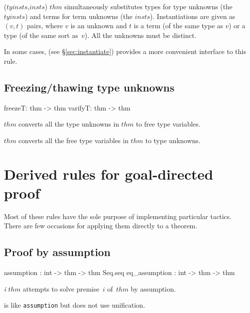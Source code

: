 \begin{ttdescription}
\item[\ttindexbold{instantiate} ($tyinsts$,$insts$) $thm$] 
simultaneously substitutes types for type unknowns (the
$tyinsts$) and terms for term unknowns (the $insts$).  Instantiations are
given as $(v,t)$ pairs, where $v$ is an unknown and $t$ is a term (of the
same type as $v$) or a type (of the same sort as~$v$).  All the unknowns
must be distinct.  

In some cases,  (see \S\ref{sec:instantiate})
provides a more convenient interface to this rule.
\end{ttdescription}




\subsection{Freezing/thawing type unknowns}
\begin{ttbox} 
freezeT: thm -> thm
varifyT: thm -> thm
\end{ttbox}
\begin{ttdescription}
\item[\ttindexbold{freezeT} $thm$] 
converts all the type unknowns in $thm$ to free type variables.

\item[\ttindexbold{varifyT} $thm$] 
converts all the free type variables in $thm$ to type unknowns.
\end{ttdescription}


\section{Derived rules for goal-directed proof}
Most of these rules have the sole purpose of implementing particular
tactics.  There are few occasions for applying them directly to a theorem.

\subsection{Proof by assumption}
\begin{ttbox} 
assumption    : int -> thm -> thm Seq.seq
eq_assumption : int -> thm -> thm
\end{ttbox}
\begin{ttdescription}
\item[\ttindexbold{assumption} {\it i} $thm$] 
attempts to solve premise~$i$ of~$thm$ by assumption.

\item[\ttindexbold{eq_assumption}] 
is like {\tt assumption} but does not use unification.
\end{ttdescription}


